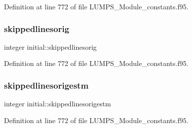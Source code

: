 Definition at line 772 of file L\+U\+M\+P\+S\+\_\+\+Module\+\_\+constants.\+f95.

\mbox{\label{namespaceinitial_a10df3f69c115c80116ea720242fc42f0}} 
\subsubsection{\texorpdfstring{skippedlinesorig}{skippedlinesorig}}
{\footnotesize\ttfamily integer initial\+::skippedlinesorig}



Definition at line 772 of file L\+U\+M\+P\+S\+\_\+\+Module\+\_\+constants.\+f95.

\mbox{\label{namespaceinitial_add6dafb7b5eb7b3be03f1ef5ea9ee0c7}} 
\subsubsection{\texorpdfstring{skippedlinesorigestm}{skippedlinesorigestm}}
{\footnotesize\ttfamily integer initial\+::skippedlinesorigestm}



Definition at line 772 of file L\+U\+M\+P\+S\+\_\+\+Module\+\_\+constants.\+f95.

